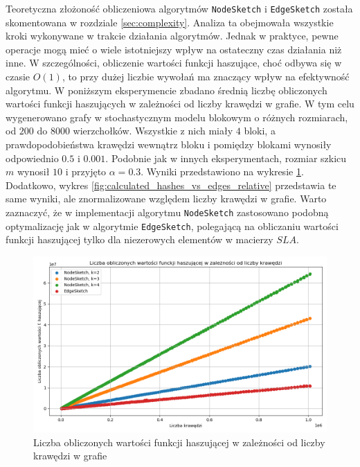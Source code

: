    Teoretyczna złożoność obliczeniowa algorytmów \texttt{NodeSketch} i \texttt{EdgeSketch} została skomentowana w rozdziale \ref{sec:complexity}. Analiza ta obejmowała wszystkie kroki wykonywane w trakcie działania algorytmów. Jednak w praktyce, pewne operacje mogą mieć o wiele istotniejszy wpływ na ostateczny czas działania niż inne. W szczególności, obliczenie wartości funkcji haszujące, choć odbywa się w czasie $O(1)$, to przy dużej liczbie wywołań ma znaczący wpływ na efektywność algorytmu. W poniższym eksperymencie zbadano średnią liczbę obliczonych wartości funkcji haszujących w zależności od liczby krawędzi w grafie. W tym celu wygenerowano grafy w stochastycznym modelu blokowym o różnych rozmiarach, od $200$ do $8000$ wierzchołków. Wszystkie z nich miały $4$ bloki, a prawdopodobieństwa krawędzi wewnątrz bloku i pomiędzy blokami wynosiły odpowiednio $0.5$ i $0.001$. Podobnie jak w innych eksperymentach, rozmiar szkicu $m$ wynosił $10$ i przyjęto $\alpha = 0.3$. Wyniki przedstawiono na wykresie \ref{fig:calculated_hashes_vs_edges_all}. Dodatkowo, wykres \ref{fig:calculated_hashes_vs_edges_relative} przedstawia te same wyniki, ale znormalizowane względem liczby krawędzi w grafie. Warto zaznaczyć, że w implementacji algorytmu \texttt{NodeSketch} zastosowano podobną optymalizację jak w algorytmie \texttt{EdgeSketch}, polegającą na obliczaniu wartości funkcji haszującej tylko dla niezerowych elementów w macierzy $SLA$. 

\begin{figure}[!ht]
    \includegraphics[width=16cm]{img/calculated_hashes_vs_edges_all.png}
    \centering
    \caption[Liczba operacji]{Liczba obliczonych wartości funkcji haszującej w zależności od liczby krawędzi w grafie}
    \label{fig:calculated_hashes_vs_edges_all}
\end{figure}

